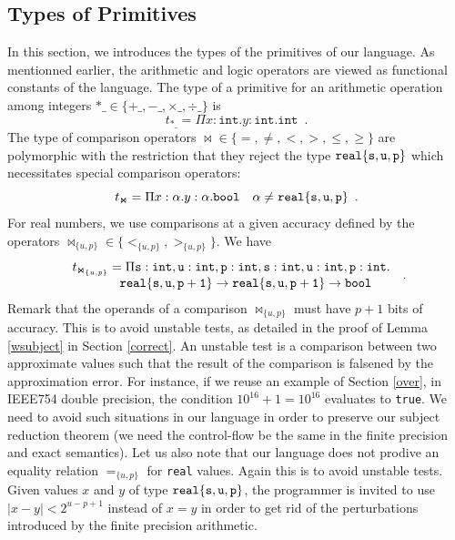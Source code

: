 \subsection{Types of Primitives}
\label{secdefprim}

In this section, we introduces the types of the primitives of our language.
As mentionned earlier, the arithmetic and logic operators are viewed as functional constants of the language. 
The type of a primitive for an arithmetic operation among integers $\ast\_  \in\{+\_, -\_,\times\_,\div\_\}$ is
\begin{equation}\label{eqtypint}
t_{\ast\_}=\Pi x:\texttt{int}.y:\texttt{int}.\texttt{int}\enspace .
\end{equation}
The type of comparison operators $\Join\in\{=,\not=,<,>,\le,\ge\}$ are polymorphic with the restriction
that they reject the type $\mathtt{real\{s,u,p\}}$ which necessitates special comparison operators:
\begin{equation}\label{eqtyprel}
t_{\Join}=\Pi x:\alpha.y:\alpha.\texttt{bool}\quad \alpha\not=\mathtt{real\{s,u,p\}}\enspace .
\end{equation}
For real numbers, we use comparisons at a given accuracy defined by the operators $\Join_{\{u,p\}}\in
\{<_{\{u,p\}},>_{\{u,p\}}\}$. We have
$$
\begin{array}{c}
t_{\Join_{\{u,p\}}} = \Pi \mathtt{s}:\texttt{int},\mathtt{u}:\texttt{int}, \mathtt{p}:\texttt{int},
\mathtt{s}:\texttt{int}, \mathtt{u}:\texttt{int}, \mathtt{p}:\texttt{int}.\\
\hspace{0.8cm}\mathtt{real\{s,u,p+1\}}\rightarrow\mathtt{real\{s,u,p+1\}}
\rightarrow\mathtt{bool}
\end{array}\enspace .
$$
Remark that the operands of a comparison $\Join_{\{u,p\}}$ must have $p+1$ bits of accuracy.
This is to avoid unstable tests, as detailed in the proof of Lemma \ref{wsubject} in Section \ref{correct}. 
An unstable test is a comparison between two approximate values
such that the result of the comparison is falsened by the approximation error.
For instance, if we reuse an example of Section \ref{over}, in IEEE754 double precision,
the condition $10^{16}+1=10^{16}$ evaluates to \texttt{true}. We need to avoid such situations
in our language in order to preserve our subject reduction theorem (we need the control-flow
be the same in the finite precision and exact semantics).
Let us also note
that our language does not prodive an equality relation $=_{\{u,p\}}$ for \texttt{real} values.
Again this is to avoid unstable tests. Given values $x$ and $y$ of type $\mathtt{real\{s,u,p\}}$,
the programmer is invited to use $|x-y|<2^{u-p+1}$
instead of $x=y$ in order to get rid of the perturbations introduced by the finite precision arithmetic.

